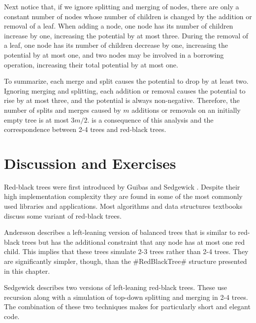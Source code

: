 Next notice that, if we ignore splitting and merging of nodes, there are
only a constant number of nodes whose number of children is changed by
the addition or removal of a leaf.  When adding a node, one node has
its number of children increase by one, increasing the potential by
at most three.  During the removal of a leaf, one node has its number
of children decrease by one, increasing the potential by at most one,
and two nodes may be involved in a borrowing operation, increasing their
total potential by at most one.

To summarize, each merge and split causes the potential to drop by
at least two.  Ignoring merging and splitting, each addition or removal
causes the potential to rise by at most three, and the potential is always
non-negative.  Therefore, the number of splits and merges caused by $m$
additions or removals on an initially empty tree is at most $3m/2$.
 is a consequence of this analysis and the
correspondence between 2-4 trees and red-black trees.

\section{Discussion and Exercises}

Red-black trees were first introduced by Guibas and Sedgewick \cite{gs78}.
Despite their high implementation complexity they are found in some of
the most commonly used libraries and applications.  Most algorithms and
data structures textbooks discuss some variant of red-black trees.

Andersson \cite{a93} describes a left-leaning version of balanced trees
that is similar to red-black trees but has the additional constraint
that any node has at most one red child.  This implies that these trees
simulate 2-3 trees rather than 2-4 trees.  They are significantly simpler,
though, than the #RedBlackTree# structure presented in this chapter.

Sedgewick \cite{s08} describes two versions of left-leaning red-black
trees.  These use recursion along with a simulation of top-down splitting
and merging in 2-4 trees. The combination of these two techniques makes
for particularly short and elegant code.

